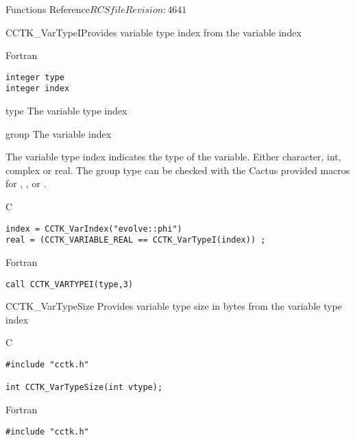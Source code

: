 \begin{cactuspart}{ Functions Reference}{$RCSfile$}{$Revision: 4641 $}
\begin{FunctionDescription}{CCTK\_VarTypeI}{Provides variable type index from the variable index}
\begin{SynopsisSection}
\begin{Synopsis}{Fortran}
\begin{verbatim}
integer type
integer index\end{verbatim}
\end{Synopsis}
\end{SynopsisSection}
\begin{ParameterSection}
\begin{Parameter}{type}
The variable type index
\end{Parameter}
\begin{Parameter}{group}
The variable index
\end{Parameter}
\end{ParameterSection}
\begin{Discussion}
The variable type index indicates the type of the variable.
Either character, int, complex or real. The group type can be checked
with the Cactus provided macros for , ,  or .
\end{Discussion}
\begin{ExampleSection}
\begin{Example}{C}
\begin{verbatim}
index = CCTK_VarIndex("evolve::phi")
real = (CCTK_VARIABLE_REAL == CCTK_VarTypeI(index)) ;
\end{verbatim}
\end{Example}
\begin{Example}{Fortran}
\begin{verbatim}
call CCTK_VARTYPEI(type,3)
\end{verbatim}
\end{Example}
\end{ExampleSection}
\end{FunctionDescription}

\begin{FunctionDescription}{CCTK\_VarTypeSize}
\label{CCTK-VarTypeSize}
Provides variable type size in bytes from the variable type index

\begin{SynopsisSection}
\begin{Synopsis}{C}
\begin{verbatim}
#include "cctk.h"

int CCTK_VarTypeSize(int vtype);
\end{verbatim}
\end{Synopsis}
\begin{Synopsis}{Fortran}
\begin{verbatim}
#include "cctk.h"


\end{verbatim}
\end{Synopsis}
\end{SynopsisSection}
\end{FunctionDescription}
\end{cactuspart}
